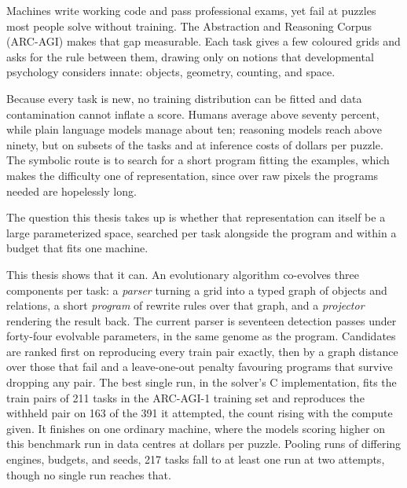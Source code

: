 
Machines write working code and pass professional exams, yet fail at puzzles most people
solve without training. The Abstraction and Reasoning Corpus (ARC-AGI) makes that gap
measurable. Each task gives a few coloured grids and asks for the rule between them, drawing
only on notions that developmental psychology considers innate: objects, geometry, counting,
and space.

Because every task is new, no training distribution can be fitted and data contamination
cannot inflate a score. Humans average above
seventy percent, while plain language models manage about ten; reasoning
models reach above ninety, but on subsets of the tasks and at inference costs of dollars per
puzzle. The symbolic route is to search for a short program fitting the examples, which
makes the difficulty one of representation, since over raw pixels the programs needed are
hopelessly long.

The question this thesis takes up is whether that representation can itself be a large
parameterized space, searched per task alongside the program and within a budget that fits one
machine.

This thesis shows that it can. An evolutionary algorithm co-evolves three components per
task: a \emph{parser} turning a grid into a typed graph of objects and relations, a short
\emph{program} of rewrite rules over that graph, and a \emph{projector} rendering the result
back. The current parser is seventeen detection passes under forty-four evolvable parameters, in the same
genome as the program. Candidates are ranked first on reproducing every train pair
exactly, then by a graph distance over those that fail and a leave-one-out penalty favouring
programs that survive dropping any pair. The best single run, in the solver's C
implementation, fits the train pairs of 211 tasks in the ARC-AGI-1 training set and reproduces
the withheld pair on 163 of the 391 it attempted, the count rising with the compute given. It
finishes on one ordinary machine, where the models scoring higher on this benchmark run in
data centres at dollars per puzzle. Pooling runs of differing engines, budgets, and seeds, 217
tasks fall to at least one run at two attempts, though no single run reaches that.

